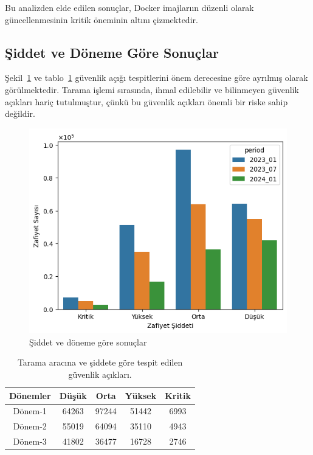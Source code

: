 Bu analizden elde edilen sonuçlar, Docker imajlarıın düzenli olarak güncellenmesinin kritik öneminin altını çizmektedir.

\subsection{Şiddet ve Döneme Göre Sonuçlar}\label{subsec:results-severity-and-period}

Şekil~\ref{fig:vuln-severity-period-1} ve tablo~\ref{tab:vuln-severity-period-1} güvenlik açığı tespitlerini önem derecesine göre ayrılmış olarak görülmektedir. Tarama işlemi sırasında, ihmal edilebilir ve bilinmeyen güvenlik açıkları hariç tutulmuştur, çünkü bu güvenlik açıkları önemli bir riske sahip değildir.

\begin{figure}
    \centering
    \includegraphics[width=1\linewidth]{images/s2/vuln-severity-period-1.png}
    \caption{Şiddet ve döneme göre sonuçlar}\label{fig:vuln-severity-period-1}
\end{figure}

\begin{table}
    \centering
    \begin{tabular}{ |c|c|c|c|c| }
        \hline
        Dönemler & Düşük & Orta & Yüksek & Kritik \\
        \hline
        Dönem-1 & 64263 & 97244 & 51442 & 6993 \\
        Dönem-2 & 55019 & 64094 & 35110 & 4943 \\
        Dönem-3 & 41802 & 36477 & 16728 & 2746 \\
        \hline
    \end{tabular}
    \caption{Tarama aracına ve şiddete göre tespit edilen güvenlik açıkları.}\label{tab:vuln-severity-period-1}
\end{table}

